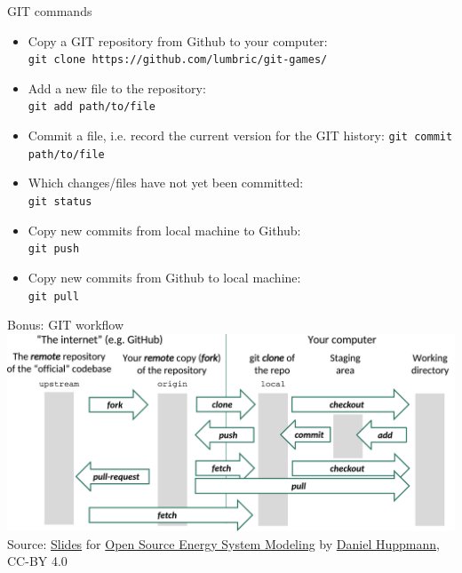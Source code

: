 \begin{frame}[fragile]{GIT commands}
    \begin{itemize}
        \item Copy a GIT repository from Github to your computer:\\
            \verb|git clone https://github.com/lumbric/git-games/|
        \item Add a new file to the repository:\\
            \verb|git add path/to/file|
        \item Commit a file, i.e. record the current version for the GIT history:
            \verb|git commit path/to/file|
        \item Which changes/files have not yet been committed:\\
            \verb|git status|
        \item Copy new commits from local machine to Github:\\
            \verb|git push|
        \item Copy new commits from Github to local machine:\\
            \verb|git pull|
    \end{itemize}
\end{frame}




\begin{frame}[fragile]{Bonus: GIT workflow}
    \includegraphics[width=\textwidth]{images/git-workflow.pdf}
    \pause
    \vfill
    {\tiny Source:
    \href{https://data.ene.iiasa.ac.at/teaching/_static/osesm_summer2019/Lecture_1.pdf}{Slides} for
    \href{https://data.ene.iiasa.ac.at/teaching/#tu-vienna-summer-semester-2019-370-062}{Open Source Energy System Modeling}
    by \href{github.com/danielhuppmann}{Daniel Huppmann}, CC-BY 4.0
    }
\end{frame}


